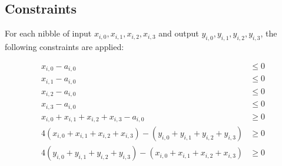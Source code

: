 \subsection*{Constraints}

For each nibble of input \( x_{i,0}, x_{i,1}, x_{i,2}, x_{i,3} \) and output \( y_{i,0}, y_{i,1}, y_{i,2}, y_{i,3} \), the following constraints are applied:

\begin{align*}
    x_{i,0} - a_{i,0}                                                                  & \leq 0 \\
    x_{i,1} - a_{i,0}                                                                  & \leq 0 \\
    x_{i,2} - a_{i,0}                                                                  & \leq 0 \\
    x_{i,3} - a_{i,0}                                                                  & \leq 0 \\
    x_{i,0} + x_{i,1} + x_{i,2} + x_{i,3} - a_{i,0}                                    & \geq 0 \\
    4(x_{i,0} + x_{i,1} + x_{i,2} + x_{i,3}) - (y_{i,0} + y_{i,1} + y_{i,2} + y_{i,3}) & \geq 0 \\
    4(y_{i,0} + y_{i,1} + y_{i,2} + y_{i,3}) - (x_{i,0} + x_{i,1} + x_{i,2} + x_{i,3}) & \geq 0
\end{align*}


